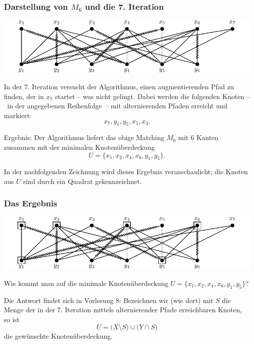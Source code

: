 \documentclass[smaller]{beamer}
\begin{document}
\begin{frame}
 \frametitle{Darstellung von $M_6$ und die 7. Iteration}
 \begin{center}
  \includegraphics[scale=0.8]{fig59.pdf}
 \end{center}
 In der 7. Iteration versucht der Algorithmus, einen augmentierenden Pfad zu finden, der in $x_7$ startet -- was nicht gelingt. Dabei werden die folgenden Knoten --~in der angegebenen Reihenfolge~-- mit alternierenden Pfaden erreicht und markiert: $$x_7, y_1, y_5, x_5, x_3.$$

\alert{Ergebnis}: Der Algorithmus liefert das obige Matching $M_6$ mit 6 Kanten zusammen mit der minimalen Knotenüberdeckung
\[
U = \big\{ x_1, x_2, x_4, x_6, y_1, y_5 \big\}.
\]

In der nachfolgenden Zeichnung wird dieses Ergebnis veranschaulicht; die Knoten aus $U$ sind durch ein Quadrat gekennzeichnet.
\end{frame}

\begin{frame}
\frametitle{Das Ergebnis}
 \begin{center}
  \includegraphics[scale=0.8]{fig60.pdf}
 \end{center}
 \alert{Wie kommt man auf die minimale Knotenüberdeckung $U = \big\{ x_1, x_2, x_4, x_6, y_1, y_5 \big\}$}?

Die Antwort findet sich in Vorlesung 8: Bezeichnen wir (wie dort) mit $S$ die Menge der in der 7. Iteration mittels alternierender Pfade erreichbaren Knoten, so ist
\[
U = \big( X \setminus S \big) \cup \big( Y \cap S \big)
\]
die gewünschte Knotenüberdeckung.
\end{frame}
\end{document}
